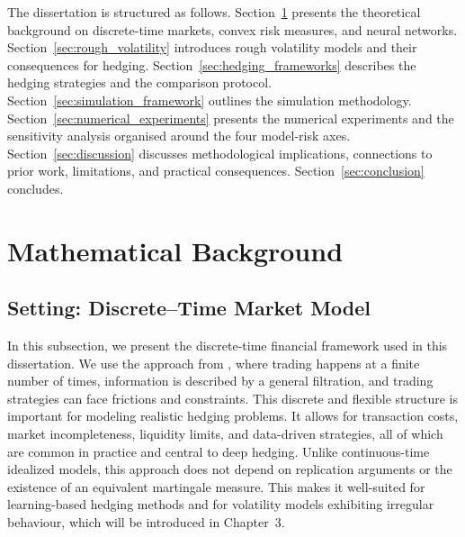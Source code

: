 \documentclass[12pt,a4paper]{article}
\theoremstyle{definition}
\theoremstyle{plain}
\theoremstyle{remark}
\theoremstyle{plain}
\begin{document}
The dissertation is structured as follows. Section~\ref{sec:math_background} presents the theoretical background on discrete-time markets, convex risk measures, and neural networks. Section~\ref{sec:rough_volatility} introduces rough volatility models and their consequences for hedging. Section~\ref{sec:hedging_frameworks} describes the hedging strategies and the comparison protocol. Section~\ref{sec:simulation_framework} outlines the simulation methodology. Section~\ref{sec:numerical_experiments} presents the numerical experiments and the sensitivity analysis organised around the four model-risk axes. Section~\ref{sec:discussion} discusses methodological implications, connections to prior work, limitations, and practical consequences. Section~\ref{sec:conclusion} concludes.

\newpage
\section{Mathematical Background}
\label{sec:math_background}

\subsection{Setting: Discrete--Time Market Model}
\label{subsec:discrete_time_setting}

In this subsection, we present the discrete-time financial framework used in this dissertation.
We use the approach from \cite{Buehler2019DeepHedging}, where trading happens at a finite number of times, information is described by a general filtration, and trading strategies can face frictions and constraints.
This discrete and flexible structure is important for modeling realistic hedging problems. It allows for transaction costs, market incompleteness, liquidity limits, and data-driven strategies, all of which are common in practice and central to deep hedging.
Unlike continuous-time idealized models, this approach does not depend on replication arguments or the existence of an equivalent martingale measure. This makes it well-suited for learning-based hedging methods and for volatility models exhibiting irregular behaviour, which will be introduced in Chapter~3.
\end{document}
